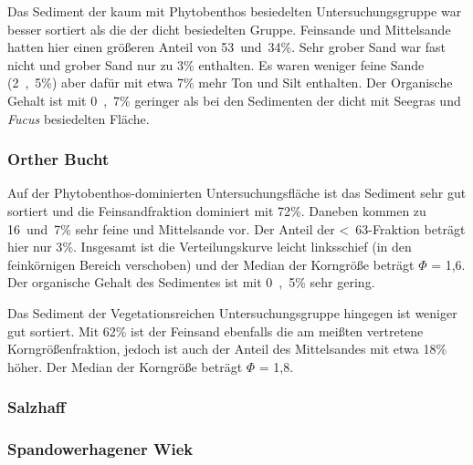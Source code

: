 Das Sediment der kaum mit Phytobenthos besiedelten Untersuchungsgruppe war besser sortiert als die der dicht besiedelten Gruppe. Feinsande und Mittelsande hatten hier einen größeren Anteil von \unit{53 und 34}{\%}. Sehr grober Sand war fast nicht und grober Sand nur zu \unit{3}{\%} enthalten. Es waren weniger feine Sande (\unit{2,5}{\%}) aber dafür mit etwa \unit{7}{\%} mehr Ton und Silt enthalten. Der Organische Gehalt ist mit \unit{0,7}{\%} geringer als bei den Sedimenten der dicht mit Seegras und \textit{Fucus} besiedelten Fläche.



\subsubsection{Orther Bucht}

Auf der Phytobenthos-dominierten Untersuchungsfläche ist das Sediment sehr gut sortiert und die Feinsandfraktion dominiert mit \unit{72}{\%}. Daneben kommen zu \unit{16 und 7}{\%} sehr feine und Mittelsande vor. Der Anteil der \unit{<63}{\mu\metre}-Fraktion beträgt hier nur \unit{3}{\%}. Insgesamt ist die Verteilungskurve leicht linksschief (in den feinkörnigen Bereich verschoben) und der Median der Korngröße beträgt $ \Phi $ = 1,6. Der organische Gehalt des Sedimentes ist mit \unit{0,5}{\%} sehr gering.

Das Sediment der Vegetationsreichen Untersuchungsgruppe hingegen ist weniger gut sortiert. Mit \unit{62}{\%} ist der Feinsand ebenfalls die am meißten vertretene Korngrößenfraktion, jedoch ist auch der Anteil des Mittelsandes mit etwa \unit{18}{\%} höher. Der Median der Korngröße beträgt $ \Phi $ = 1,8. 

\subsubsection{Salzhaff}
\subsubsection{Spandowerhagener Wiek}



